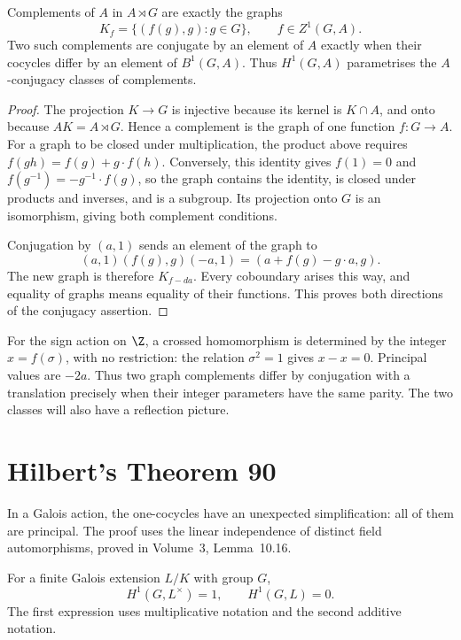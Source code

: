 \begin{proposition}\label{prop:complements}
Complements of $A$ in $A\rtimes G$ are exactly the graphs
\[
K_f=\{(f(g),g):g\in G\},\qquad f\in Z^1(G,A).
\]
Two such complements are conjugate by an element of $A$ exactly when their cocycles differ by an element of $B^1(G,A)$. Thus $H^1(G,A)$ parametrises the $A$-conjugacy classes of complements.
\end{proposition}

\begin{proof}
The projection $K\to G$ is injective because its kernel is $K\cap A$, and onto because $AK=A\rtimes G$. Hence a complement is the graph of one function $f:G\to A$.
For a graph to be closed under multiplication, the product above requires
$f(gh)=f(g)+g\cdot f(h)$.
Conversely, this identity gives $f(1)=0$ and
$f(g^{-1})=-g^{-1}\cdot f(g)$, so the graph contains the identity, is closed under products and inverses, and is a subgroup. Its projection onto $G$ is an isomorphism, giving both complement conditions.

Conjugation by $(a,1)$ sends an element of the graph to
\[
(a,1)(f(g),g)(-a,1)=(a+f(g)-g\cdot a,g).
\]
The new graph is therefore $K_{f-da}$. Every coboundary arises this way, and equality of graphs means equality of their functions. This proves both directions of the conjugacy assertion.
\end{proof}

For the sign action on $\Z$, a crossed homomorphism is determined by the integer $x=f(\sigma)$, with no restriction: the relation $\sigma^2=1$ gives $x-x=0$. Principal values are $-2a$. Thus two graph complements differ by conjugation with a translation precisely when their integer parameters have the same parity. The two classes will also have a reflection picture.

\section{Hilbert's Theorem 90}

In a Galois action, the one-cocycles have an unexpected simplification: all of them are principal. The proof uses the linear independence of distinct field automorphisms, proved in Volume~3, Lemma~10.16.

\begin{theorem}\label{thm:hilbert90}
For a finite Galois extension $L/K$ with group $G$,
\[
H^1(G,L^\times)=1,\qquad H^1(G,L)=0.
\]
The first expression uses multiplicative notation and the second additive notation.
\end{theorem}

